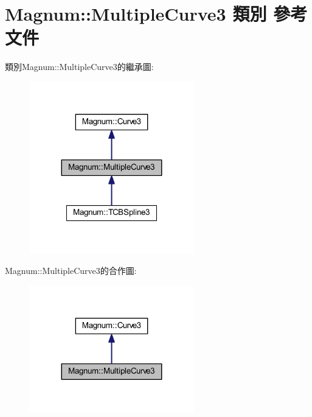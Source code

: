 \hypertarget{class_magnum_1_1_multiple_curve3}{}\section{Magnum\+:\+:Multiple\+Curve3 類別 參考文件}
\label{class_magnum_1_1_multiple_curve3}


類別\+Magnum\+:\+:Multiple\+Curve3的繼承圖\+:\nopagebreak
\begin{figure}[H]
\begin{center}
\leavevmode
\includegraphics[width=203pt]{class_magnum_1_1_multiple_curve3__inherit__graph}
\end{center}
\end{figure}


Magnum\+:\+:Multiple\+Curve3的合作圖\+:\nopagebreak
\begin{figure}[H]
\begin{center}
\leavevmode
\includegraphics[width=203pt]{class_magnum_1_1_multiple_curve3__coll__graph}
\end{center}
\end{figure}
